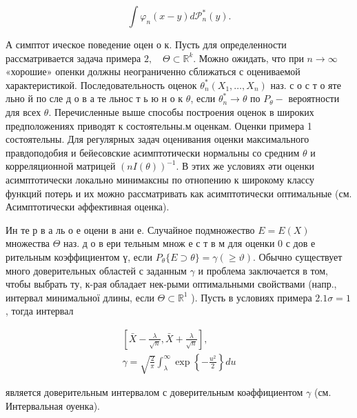 \documentclass[10pt]{article}
\begin{document}
\[

\int \varphi_{n}(x-y) d \mathscr{P}_{n}^{*}(y) .

\]



А симптот ическое поведение оцен о к. Пусть для определенности рассматривается задача примера $2, \quad \Theta \subset \mathbb{R}^{k}$. Можно ожидать, что при $n \rightarrow \infty$ «хорошие» опенки должны неограниченно сближаться с оцениваемой характеристикой. Последовательность оценок $\theta_{n}^{*}\left(X_{1}, \ldots, X_{n}\right)$ наз. с о с т о яте льно й по сле д о в а те льнос т ь ю н о к $\theta$, если $\theta_{n}^{*} \rightarrow \theta$ по $P_{\theta}-$ вероятности для всех $\theta$. Перечисленные выше способы построения оценок в широких предположениях приводят к состоятельны.м оценкам. Оценки примера 1 состоятельны. Для регулярных задач оценивания оценки максимального правдоподобия и бейесовские асимптотически нормальны со средним $\theta$ и корреляционной матрицей $(n I(\theta))^{-1}$. В этих же условиях әти оценки асимптотически локально минимаксны по отнопению к широкому классу функций потерь и их можно рассматривать как асимптотически оптимальные (см. Асимптотически әффективная оценка).



Ин те р в а ль о е оцени в ани е. Случайное подмножество $E=E(X)$ множества $\Theta$ наз. д о в ери тельным множ е с т в м для оценки 0 с дов е рительным коэффициентом $ү$, если $P_{\theta}\{E \supset \theta\}=\gamma(\geqslant \vartheta)$. Обычно существует много доверительных областей с заданным $\gamma$ и проблема заключается в том, чтобы выбрать ту, к-рая обладает нек-рыми оптимальными свойствами (напр., интервал минимальної длины, если $\Theta \subset \mathbb{R}^{1}$ ). Пусть в условиях примера $2.1 \sigma=1$, тогда интервал



\[

\begin{gathered}

{\left[\bar{X}-\frac{\lambda}{\sqrt{n}}, \bar{X}+\frac{\lambda}{\sqrt{n}}\right],} \\

\gamma=\sqrt{\frac{2}{\pi}} \int_{\lambda}^{\infty} \exp \left\{-\frac{u^{2}}{2}\right\} d u

\end{gathered}

\]



является доверительным интервалом с доверительным коәффициентом $\gamma$ (см. Интервальная оуенка).
\end{document}
